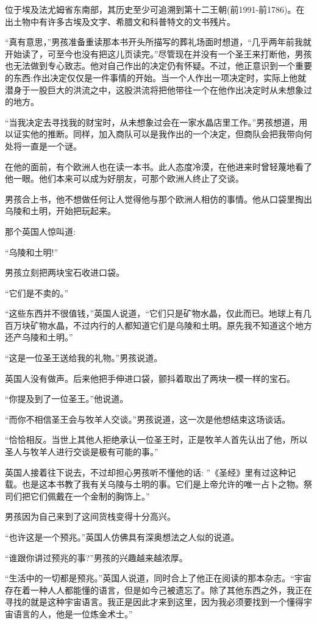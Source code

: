 \documentclass[twoside,openany]{book}
\begin{document}
位于埃及法尤姆省东南部，其历史至少可追溯到第十二王朝(前1991-前1786)。在出土物中有许多古埃及文字、希腊文和科普特文的文书残片。

“真有意思，”男孩准备重读那本书开头所描写的葬礼场面时想道，“几乎两年前我就开始读了，可至今也没有把这儿页读完。”尽管现在并没有一个圣王来打断他，男孩也无法做到专心致志。他对自己作出的决定仍有怀疑。不过，他正意识到一个重要的东西:作出决定仅仅是一件事情的开始。当一个人作出一项决定时，实际上他就潜身于一股巨大的洪流之中，这股洪流将把他带往一个在他作出决定时从未想象过的地方。

“当我决定去寻找我的财宝时，从未想象过会在一家水晶店里工作。”男孩想道，用以证实他的推断。同样，加入商队可以是我作出的一个决定，但商队会把我带向何处将一直是一个谜。

在他的面前，有个欧洲人也在读一本书。此人态度冷漠，在他进来时曾轻蔑地看了他一眼。他们本来可以成为好朋友，可那个欧洲人终止了交谈。

男孩合上书，他不想做任何让人觉得他与那个欧洲人相仿的事情。他从口袋里掏出乌陵和土明，开始把玩起来。

那个英国人惊叫道:

“乌陵和土明!”

男孩立刻把两块宝石收进口袋。

“它们是不卖的。”

“这些东西并不很值钱，”英国人说道，“它们只是矿物水晶，仅此而已。地球上有几百万块矿物水晶，不过内行的人都知道它们是乌陵和土明。原先我不知道这个地方还产乌陵和土明。”

“这是一位圣王送给我的礼物。”男孩说道。

英国人没有做声。后来他把手伸进口袋，颤抖着取出了两块一模一样的宝石。

“你提及到了一位圣王。”他说道。

“而你不相信圣王会与牧羊人交谈。”男孩说道，这一次是他想结束这场谈话。

“恰恰相反。当世上其他人拒绝承认一位圣王时，正是牧羊人首先认出了他，所以圣人与牧羊人进行交谈是极有可能的事。”

英国人接着往下说去，不过却担心男孩听不懂他的话: ”《圣经》里有过这种记载。也是这本书教了我有关乌陵与土明的事。它们是上帝允许的唯一占卜之物。祭司们把它们佩戴在一个金制的胸饰上。”

男孩因为自己来到了这间货栈变得十分高兴。

“也许这是一个预兆。”英国人仿佛具有深奥想法之人似的说道。

“谁跟你讲过预兆的事?”男孩的兴趣越来越浓厚。

“生活中的一切都是预兆。”英国人说道，同时合上了他正在阅读的那本杂志。“宇宙存在着一种人人都能懂的语言，但是如今己被遗忘了。除了其他东西之外，我正在寻找的就是这种宇宙语言。我正是因此才来到这里，因为我必须要找到一个懂得宇宙语言的人，他是一位炼金术士。”
\end{document}
